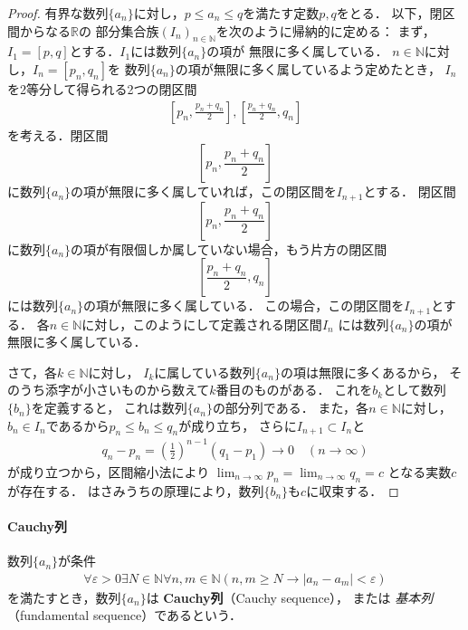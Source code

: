      \begin{proof}
       有界な数列$\{ a_n \}$に対し，$p \leq a_n \leq q$を満たす定数$p , q$をとる．
       以下，閉区間からなる$\mathbb{R}$の
       部分集合族$(I_n )_{n \in \mathbb{N}}$を次のように帰納的に定める：
       まず，$I_1=[p,q]$とする．$I_1$には数列$\{ a_n \}$の項が
       無限に多く属している．
       $n \in \mathbb{N}$に対し，$I_n=[p_n,q_n]$を
       数列$\{ a_n \}$の項が無限に多く属しているよう定めたとき，
       $I_n$を2等分して得られる2つの閉区間
       \begin{align*}
         \left[ p_n, \frac{p_n+q_n}{2} \right] ,  \left[ \frac{p_n + q_n}{2} ,q_n \right]
       \end{align*}
       を考える．閉区間
       \[
         \left[ p_n , \frac{p_n + q_n}{2} \right]
       \]
       に数列$\{ a_n \}$の項が無限に多く属していれば，この閉区間を$I_{n+1}$とする．
       閉区間
        \[
         \left[ p_n , \frac{p_n + q_n}{2} \right]
       \]
       に数列$\{ a_n \}$の項が有限個しか属していない場合，もう片方の閉区間
       \[ 
         \left[ \frac{p_n+q_n}{2} , q_n \right]
       \]
       には数列$\{ a_n \}$の項が無限に多く属している．
       この場合，この閉区間を$I_{n+1}$とする．
       各$n \in \mathbb{N}$に対し，このようにして定義される閉区間$I_n$
       には数列$\{ a_n \}$の項が無限に多く属している．
       
       さて，各$k \in \mathbb{N}$に対し，
       $I_k$に属している数列$\{ a_n \}$の項は無限に多くあるから，
       そのうち添字が小さいものから数えて$k$番目のものがある．
       これを$b_k$として数列$\{ b_n \}$を定義すると，
       これは数列$\{ a_n \}$の部分列である．
       また，各$n \in \mathbb{N}$に対し，
       $b_n \in I_n$であるから$p_n \leq b_n \leq q_n$が成り立ち，
       さらに$I_{n+1} \subset I_n$と
       \begin{align*}
         q_n - p_n = \left( \frac{1}{2} \right) ^{n-1} 
         (q_1-p_1) \to 0 \quad ( n \to \infty)
       \end{align*}
       が成り立つから，区間縮小法により
       $\displaystyle \lim_{n \to \infty} p_n = \lim_{n \to \infty } q_n = c$
       となる実数$c$が存在する．
       はさみうちの原理により，数列$\{ b_n \}$も$c$に収束する．
     \end{proof}

    \paragraph{Cauchy列}
     数列$\{ a_n \}$が条件
     \begin{align}
       \forall \varepsilon >0 \exists N \in \mathbb{N} 
       \forall n , m \in \mathbb{N} (
       n , m \geq N \to \lvert a_n - a_m \rvert < \varepsilon)
       \label{eq:cauchyseq}
     \end{align}
     を満たすとき，数列$\{ a_n \}$は
     \textbf{Cauchy列}（Cauchy sequence），
     または
     \emph{基本列}（fundamental sequence）であるという．

